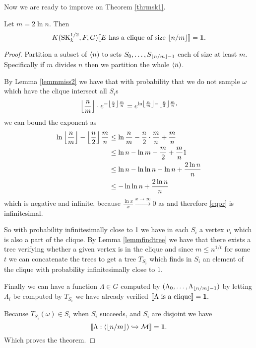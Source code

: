 Now we are ready to improve on Theorem \ref{thrmsk1}.

\begin{thrm}\label{thrmsk}
Let $m = 2 \ln n$. Then
\[K(\text{SK}_k^{1/2},F,G)\llbracket\text{$E$ has a clique of size $\left \lfloor {n/m} \right \rfloor$}\rrbracket=\textbf{1}.\]
\end{thrm}
\begin{proof}
Partition a subset of $\langle n)$ to sets $S_{0},\dots,S_{\left \lfloor {n/m} \right \rfloor-1}$ each of size at least $m$. Specifically if $m$ divides $n$ then we partition the whole $\langle n)$.

By Lemma \ref{lemmmiss2} we have that with probability that we do not sample $\omega$ which have the clique intersect all $S_i$s 
\begin{align}
\left \lfloor {\frac{n}{m}} \right \rfloor\cdot e^{-\left \lfloor {\frac{n}{2}} \right \rfloor\frac{m}{n}} = e^{\ln\left \lfloor {\frac{n}{m}} \right \rfloor-\left \lfloor {\frac{n}{2}} \right \rfloor\frac{m}{n},}\label{eqpr}
\end{align}
we can bound the exponent as
\begin{align}
\ln\left \lfloor {\frac{n}{m}} \right \rfloor-\left \lfloor {\frac{n}{2}} \right \rfloor\frac{m}{n}&\leq\ln\frac{n}{m}-\frac{n}{2}\cdot\frac{m}{n}+\frac{m}{n}\\
&\leq\ln n - \ln m - \frac{m}{2} + \frac{m}{n}1\\
&\leq \ln n - \ln \ln n - \ln n+\frac{2\ln n}{n}\\
&\leq - \ln \ln n + \frac{2\ln n}{n}
\end{align}
which is negative and infinite, because $\frac{\ln x}{x}\overset{x\to \infty}{\to} 0$ as  and therefore \eqref{eqpr} is infinitesimal.

So with probability infinitesimally close to 1 we have in each $S_i$ a vertex $v_i$ which is also a part of the clique. By Lemma \ref{lemmfindtree} we have that there exists a tree verifying whether a given vertex is in the clique and since $m\leq n^{1/t}$ for some $t$ we can concatenate the trees to get a tree $T_{S_i}$ which finds in $S_i$ an element of the clique with probability infinitesimally close to $1$.

Finally we can have a function $\Lambda\in G$ computed by $(\Lambda_0,\dots,\Lambda_{\left \lfloor {n/m} \right \rfloor-1})$ by letting $\Lambda_i$ be computed by $T_{S_i}$ we have already verified $\llbracket\Lambda\text{ is a clique}\rrbracket=\textbf{1}.$

Because $T_{S_i}(\omega)\in S_i$ when $S_i$ succeeds, and $S_i$ are disjoint we have \[\llbracket\Lambda:\langle \left \lfloor {n/m} \right \rfloor)\xhookrightarrow{} \mathcal{M}\rrbracket=\textbf{1}. \]
Which proves the theorem.
\end{proof}

